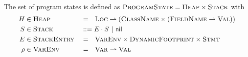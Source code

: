 The set of program states is defined as $\textup{\textsc{ProgramState}} = \textup{\textsc{Heap}} \times \textup{\textsc{Stack}}$ with
\begin{align*}
	H    & \in \textup{\textsc{Heap}}       &  & =~~ \textup{\textsc{Loc}} \rightharpoonup (\textup{\textsc{ClassName}} \times (\textup{\textsc{FieldName}} \rightharpoonup \textup{\textsc{Val}})) \\
	S    & \in \textup{\textsc{Stack}}      &  & ::= E \cdot S ~|~ \textup{\textsf{nil}}                                                                     \\
	E    & \in \textup{\textsc{StackEntry}} &  & =~~ \textup{\textsc{VarEnv}} \times \textup{\textsc{DynamicFootprint}} \times \textup{\textsc{Stmt}}                                       \\
	\rho & \in \textup{\textsc{VarEnv}}     &  & =~~ \textup{\textsc{Var}} \rightharpoonup \textup{\textsc{Val}}
\end{align*}

\begin{comment}
REQUIRED?
\begin{definition}[Topmost Stack Entry]
    Let $\topmost : \setStack \rightharpoonup \setStackEntry$ be defined as
    \begin{align*}
    &\topmost(E \cdot S) = E\\
    &\topmost(\nil) \quad\textit{ undefined}
    \end{align*}
\end{definition}
\end{comment}


\begin{comment}
Program states with scheduled statement $s$ are defined as
\begin{displaymath}
\setProgramState_s ~\defeq~ \setHeap ~\times~ \{~~ (\rho, A_d, s) \cdot S ~~|~~ \rho \in \setVarEnv,~ A_d \in \setDFootprint,~ S \in \setStack ~~\}
\end{displaymath}
\end{comment}